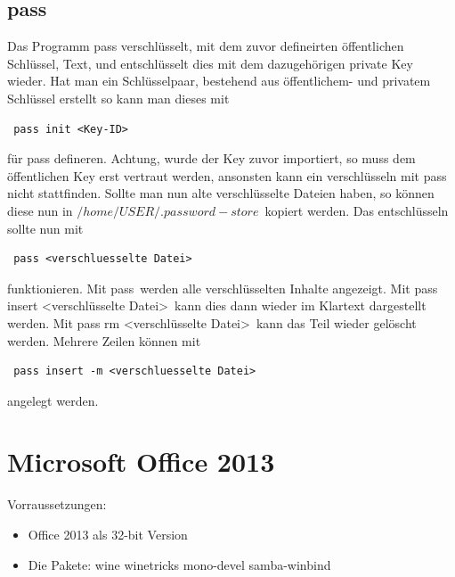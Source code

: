 \documentclass[11pt,fleqn]{book} %
\numberwithin{equation}{section} %
\numberwithin{figure}{section} %
\numberwithin{table}{section} %
\begin{document}
\section{pass}
Das Programm pass verschlüsselt, mit dem zuvor defineirten öffentlichen Schlüssel, Text, und entschlüsselt dies mit dem dazugehörigen private Key wieder. Hat man ein Schlüsselpaar, bestehend aus öffentlichem- und privatem Schlüssel erstellt so kann man dieses mit
\begin{lstlisting}
 pass init <Key-ID>
\end{lstlisting}
für pass defineren. Achtung, wurde der Key zuvor importiert, so muss dem öffentlichen Key erst vertraut werden, ansonsten kann ein verschlüsseln mit pass nicht stattfinden. Sollte man nun alte verschlüsselte Dateien haben, so können diese nun in \glqq$/home/USER/.password-store$\grqq \ kopiert werden. Das entschlüsseln sollte nun mit
\begin{lstlisting}
 pass <verschluesselte Datei>
\end{lstlisting}
funktionieren. Mit \glqq pass\grqq \ werden alle verschlüsselten Inhalte angezeigt. Mit \glqq pass insert <verschlüsselte Datei>\grqq \ kann dies dann wieder im Klartext dargestellt werden. Mit \glqq pass rm <verschlüsselte Datei>\grqq \ kann das Teil wieder gelöscht werden. Mehrere Zeilen können mit
\begin{lstlisting}
 pass insert -m <verschluesselte Datei>
\end{lstlisting}
angelegt werden.
\chapter{Microsoft Office 2013}
Vorraussetzungen:\\
\begin{itemize}
 \item Office 2013 als 32-bit Version
 \item Die Pakete: wine winetricks mono-devel samba-winbind
\end{itemize}
\end{document}
